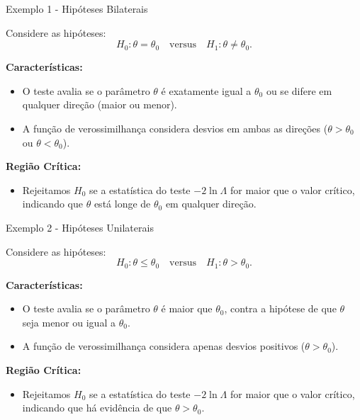 \documentclass[12pt]{beamer}
\begin{document}
\begin{frame}{Exemplo 1 - Hipóteses Bilaterais}
	\begin{block}{}
		\justifying
		Considere as hipóteses:
		\[
		H_0: \theta = \theta_{0} \quad \text{versus} \quad H_1: \theta \neq \theta_{0}.
		\]
		
		\textbf{Características:}
		\begin{itemize}
			\justifying
			\item O teste avalia se o parâmetro \(\theta\) é exatamente igual a \(\theta_{0}\) ou se difere em qualquer direção (maior ou menor).
			\item A função de verossimilhança considera desvios em ambas as direções (\(\theta > \theta_{0}\) ou \(\theta < \theta_{0}\)).
		\end{itemize}
		
		\textbf{Região Crítica:}
		\begin{itemize}
			\justifying
			\item Rejeitamos \(H_0\) se a estatística do teste \(-2 \ln \Lambda\) for maior que o valor crítico, indicando que \(\theta\) está longe de \(\theta_{0}\) em qualquer direção.
		\end{itemize}
	\end{block}
\end{frame}

\begin{frame}{Exemplo 2 - Hipóteses Unilaterais}
	\begin{block}{}
		\justifying
		Considere as hipóteses:
		\[
		H_0: \theta \leq \theta_{0} \quad \text{versus} \quad H_1: \theta > \theta_{0}.
		\]
		
		\textbf{Características:}
		\begin{itemize}
			\justifying
			\item O teste avalia se o parâmetro \(\theta\) é maior que \(\theta_{0}\), contra a hipótese de que \(\theta\) seja menor ou igual a \(\theta_{0}\).
			\item A função de verossimilhança considera apenas desvios positivos (\(\theta > \theta_{0}\)).
		\end{itemize}
		
		\textbf{Região Crítica:}
		\begin{itemize}
			\justifying
			\item Rejeitamos \(H_0\) se a estatística do teste \(-2 \ln \Lambda\) for maior que o valor crítico, indicando que há evidência de que \(\theta > \theta_{0}\).
		\end{itemize}
	\end{block}
\end{frame}
\end{document}
